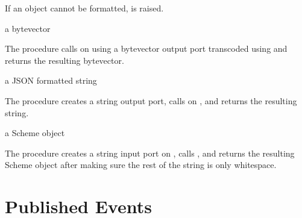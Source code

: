 If an object cannot be formatted, 
is raised.

\begin{procedure}
\end{procedure}
\returns{} a bytevector

The  procedure calls
 on  using a bytevector output port
transcoded using  and returns the
resulting bytevector.

\begin{procedure}
\end{procedure}
\returns{} a JSON formatted string

The  procedure creates a string output
port, calls  on , and returns the resulting
string.

\begin{procedure}
\end{procedure}
\returns{} a Scheme object

The  procedure creates a string input port
on , calls , and returns the resulting Scheme
object after making sure the rest of the string is only whitespace.

\section {Published Events}

\begin{event}\end{event}\antipar
\begin{argtbl}
\end{argtbl}
